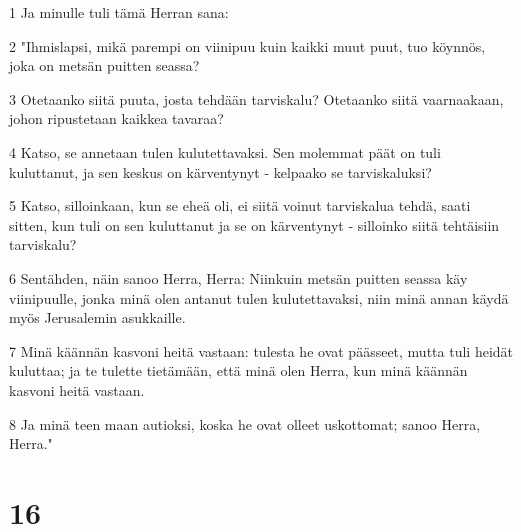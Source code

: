 \par 1 Ja minulle tuli tämä Herran sana:
\par 2 "Ihmislapsi, mikä parempi on viinipuu kuin kaikki muut puut, tuo köynnös, joka on metsän puitten seassa?
\par 3 Otetaanko siitä puuta, josta tehdään tarviskalu? Otetaanko siitä vaarnaakaan, johon ripustetaan kaikkea tavaraa?
\par 4 Katso, se annetaan tulen kulutettavaksi. Sen molemmat päät on tuli kuluttanut, ja sen keskus on kärventynyt - kelpaako se tarviskaluksi?
\par 5 Katso, silloinkaan, kun se eheä oli, ei siitä voinut tarviskalua tehdä, saati sitten, kun tuli on sen kuluttanut ja se on kärventynyt - silloinko siitä tehtäisiin tarviskalu?
\par 6 Sentähden, näin sanoo Herra, Herra: Niinkuin metsän puitten seassa käy viinipuulle, jonka minä olen antanut tulen kulutettavaksi, niin minä annan käydä myös Jerusalemin asukkaille.
\par 7 Minä käännän kasvoni heitä vastaan: tulesta he ovat päässeet, mutta tuli heidät kuluttaa; ja te tulette tietämään, että minä olen Herra, kun minä käännän kasvoni heitä vastaan.
\par 8 Ja minä teen maan autioksi, koska he ovat olleet uskottomat; sanoo Herra, Herra."

\chapter{16}

